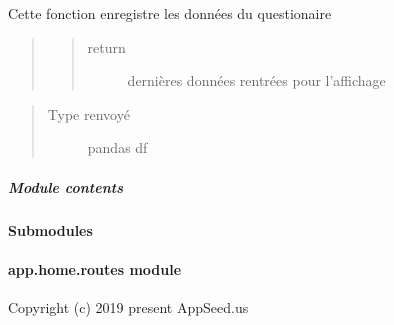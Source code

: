 \documentclass[letterpaper,10pt,french]{sphinxmanual}
\begin{document}

\begin{fulllineitems}
\label{\detokenize{app.home.content_gen:app.home.content_gen.questionaire.save_data}}
\sphinxAtStartPar
Cette fonction enregistre les données du questionaire
\begin{quote}
\begin{quote}\begin{description}
\item[{return}] \leavevmode
\sphinxAtStartPar
dernières données rentrées pour l’affichage

\end{description}\end{quote}
\end{quote}
\begin{quote}\begin{description}
\item[{Type renvoyé}] \leavevmode
\sphinxAtStartPar
pandas df

\end{description}\end{quote}

\end{fulllineitems}



\subparagraph{Module contents}
\label{\detokenize{app.home.content_gen:module-app.home.content_gen}}\label{\detokenize{app.home.content_gen:module-contents}}

\paragraph{Submodules}
\label{\detokenize{app.home:submodules}}

\paragraph{app.home.routes module}
\label{\detokenize{app.home:module-app.home.routes}}\label{\detokenize{app.home:app-home-routes-module}}
\sphinxAtStartPar
Copyright (c) 2019 \sphinxhyphen{} present AppSeed.us
\end{document}
